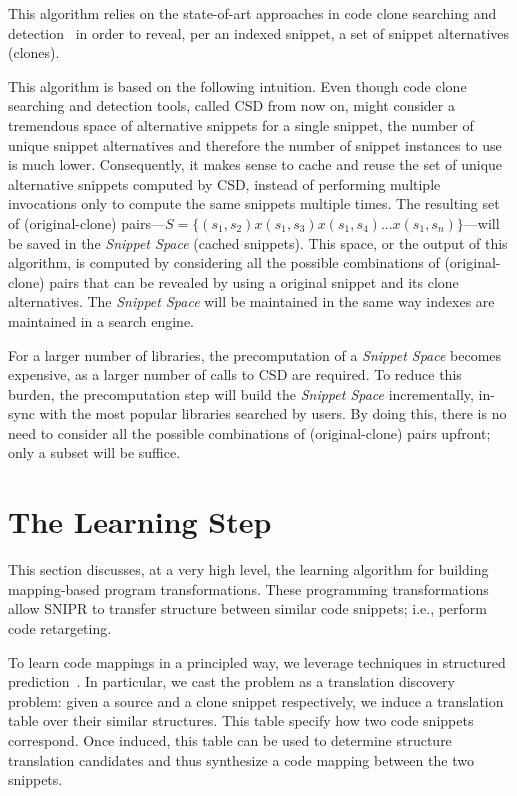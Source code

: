 This algorithm relies on the state-of-art approaches in code clone searching and detection~\cite{Jiang:2007cj, Roh:2010ts} in order to reveal, per an indexed snippet, a set of snippet alternatives (clones).

This algorithm is based on the following intuition. Even though code clone searching and detection tools, called CSD from now on, might consider a tremendous space of alternative snippets for a single snippet, the number of unique snippet alternatives and therefore the number of snippet instances to use is much lower. Consequently, it makes sense to cache and reuse the set of unique alternative snippets computed by CSD, instead of performing multiple invocations only to compute the same snippets multiple times. The resulting set of (original-clone) pairs---$S = \{(s_1, s_2) x (s_1, s_3) x (s_1, s_4) ... x (s_1, s_n)\}$---will be saved in the \emph{Snippet Space} (cached snippets). This space, or the output of this algorithm, is computed by considering all the possible combinations of (original-clone) pairs that can be revealed by using a original snippet and its clone alternatives. The \emph{Snippet Space} will be maintained in the same way indexes are maintained in a search engine.

For a larger number of libraries, the precomputation of a \emph{Snippet Space} becomes expensive, as a larger number of calls to CSD are required. To reduce this burden, the precomputation step will build the \emph{Snippet Space} incrementally, in-sync with the most popular libraries searched by users. By doing this, there is no need to consider all the possible combinations of (original-clone) pairs upfront; only a subset will be suffice.

\section{The Learning Step}
\label{sec:learning}

This section discusses, at a very high level, the learning algorithm for building mapping-based program transformations. These programming transformations allow \uppercase{SnipR} to transfer structure between similar code snippets; i.e., perform code retargeting.

To learn code mappings in a principled way, we leverage techniques in structured prediction~\cite{Collins:2002uo}. In particular, we cast the problem as a translation discovery problem: given a source and a clone snippet respectively, we induce a translation table over their similar structures. This table specify how two code snippets correspond. Once induced, this table can be used to determine structure translation candidates and thus synthesize a code mapping between the two snippets. 

